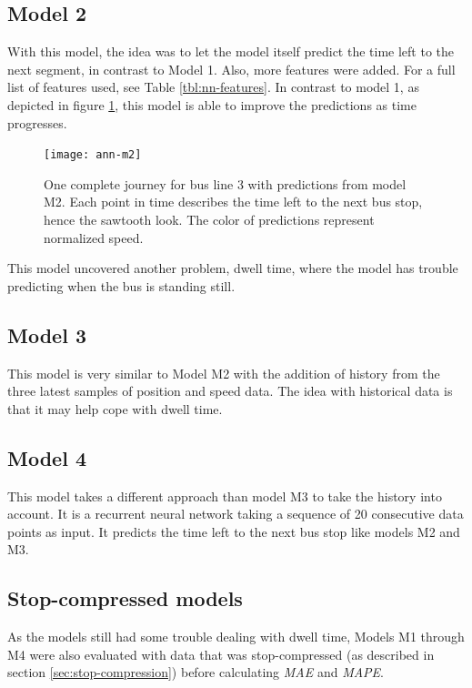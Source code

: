 \subsection{Model 2}\label{M2}
With this model, the idea was to let the model itself predict the time left to the next segment, in contrast to Model 1. Also, more features were added. For a full list of features used, see Table \ref{tbl:nn-features}. In contrast to model 1, as depicted in figure \ref{fig:ann-m2}, this model is able to improve the predictions as time progresses.


\begin{figure}[h]
  \begin{minipage}{\textwidth}
    \begin{adjustbox}{center}
      \texttt{[image: ann-m2]}
    \end{adjustbox}  
      \caption{One complete journey for bus line 3 with predictions from model M2. Each point in time describes the time left to the next bus stop, hence the sawtooth look. The color of predictions represent normalized speed.}
      \label{fig:ann-m2}      
    \end{minipage}
\end{figure}

This model uncovered another problem, dwell time, where the model has trouble predicting when the bus is standing still. 

\subsection{Model 3}\label{M3}
This model is very similar to Model M2 with the addition of history from the three latest samples of position and speed data. The idea with historical data is that it may help cope with dwell time.

\subsection{Model 4}
This model takes a different approach than model M3 to take the history into account. It is a recurrent neural network taking a sequence of 20 consecutive data points as input. It predicts the time left to the next bus stop like models M2 and M3. 

\subsection{Stop-compressed models}
As the models still had some trouble dealing with dwell time, Models M1 through M4 were also evaluated with data that was stop-compressed (as described in section \ref{sec:stop-compression}) before calculating \textit{MAE} and \textit{MAPE}. 

